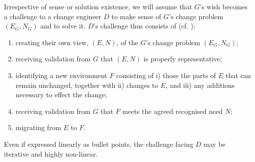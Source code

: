 \documentclass[runningheads,a4paper]{llncs}
\begin{document}
Irrespective of sense or solution existence, we will assume that $G$'s wish becomes a challenge to a change engineer $D$ to make sense of $G$'s change problem $(E_G,N_G)$ and to solve it. $D$'s challenge thus consists of (cf. \cite{hall2016a-design}):
%
\begin{enumerate}[label=CPS\arabic*.]
	\item creating their own view, $(E, N)$, of the $G$'s change problem $(E_G, N_G)$;
	\item receiving validation from $G$ that $(E, N)$ is properly representative;
	\item identifying a new environment $F$ consisting of i) those the parts of $E$ that can remain unchanged, together with ii) changes to $E$, and iii) any additions necessary to effect the change;
	\item receiving validation from $G$ that $F$ meets the agreed recognised need $N$;
	\item migrating from $E$ to $F$.
\end{enumerate}

Even if expressed linearly as bullet points, the challenge facing $D$ may be iterative and highly non-linear.

\newcommand\CM{Pixel}
\def\ColourMaker#{\textit{ColourMaker} (shortly \textit{CoMa})\gdef\ColourMaker{\textit{CoMa}}}
\newcommand{\code}[1]{\texttt{#1}}
\newcommand{\solved}{\relax}
\newcommand{\replacedBy}{\triangleright}
\newcommand{\Java}{Swift}
\end{document}

